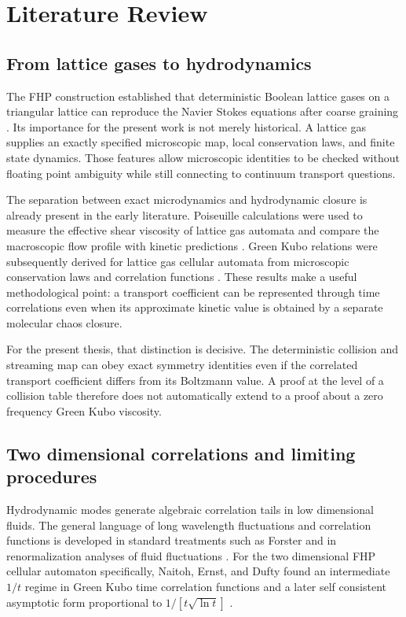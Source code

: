 \chapter{Literature Review}\label{ch:literature}

\section{From lattice gases to hydrodynamics}
The FHP construction established that deterministic Boolean lattice gases on a triangular lattice can reproduce the Navier Stokes equations after coarse graining \cite{FHP1986}. Its importance for the present work is not merely historical. A lattice gas supplies an exactly specified microscopic map, local conservation laws, and finite state dynamics. Those features allow microscopic identities to be checked without floating point ambiguity while still connecting to continuum transport questions.

The separation between exact microdynamics and hydrodynamic closure is already present in the early literature. Poiseuille calculations were used to measure the effective shear viscosity of lattice gas automata and compare the macroscopic flow profile with kinetic predictions \cite{Kadanoff1987}. Green Kubo relations were subsequently derived for lattice gas cellular automata from microscopic conservation laws and correlation functions \cite{ErnstDufty1989}. These results make a useful methodological point: a transport coefficient can be represented through time correlations even when its approximate kinetic value is obtained by a separate molecular chaos closure.

For the present thesis, that distinction is decisive. The deterministic collision and streaming map can obey exact symmetry identities even if the correlated transport coefficient differs from its Boltzmann value. A proof at the level of a collision table therefore does not automatically extend to a proof about a zero frequency Green Kubo viscosity.

\section{Two dimensional correlations and limiting procedures}
Hydrodynamic modes generate algebraic correlation tails in low dimensional fluids. The general language of long wavelength fluctuations and correlation functions is developed in standard treatments such as Forster \cite{Forster1975} and in renormalization analyses of fluid fluctuations \cite{ForsterNelsonStephen1977}. For the two dimensional FHP cellular automaton specifically, Naitoh, Ernst, and Dufty found an intermediate $1/t$ regime in Green Kubo time correlation functions and a later self consistent asymptotic form proportional to $1/[t\sqrt{\ln t}]$ \cite{Naitoh1990}.

